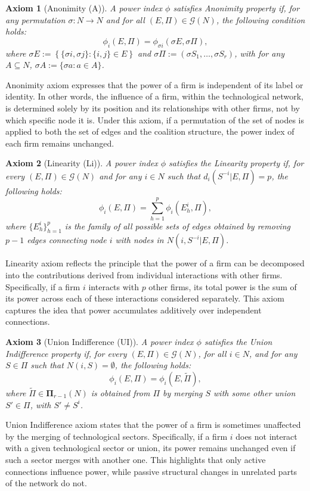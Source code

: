 \documentclass[preprint,11pt,authoryear]{elsarticle}
\theoremstyle{plain}
\newtheorem{axiom}{Axiom}
\begin{document}
\begin{axiom}[Anonimity (A)]\label{Ax-a}
A power index $\phi$ satisfies \emph{Anonimity} property if, for any permutation $\sigma: N \to N$ and for all $(E, \Pi) \in \mathcal{G}(N)$, the following condition holds:
\begin{equation*}
    \phi_i(E, \Pi) = \phi_{\sigma i}(\sigma E, \sigma \Pi),
\end{equation*}
where $\sigma E := \left\{ \{\sigma i, \sigma j\} : \{i, j\} \in E \right\}$ and $\sigma \Pi := (\sigma S_1, \ldots, \sigma S_r)$, with for any $A \subseteq N$, $\sigma A := \{\sigma a : a \in A\}$.
\end{axiom}
Anonimity axiom expresses that the power of a firm is independent of its label or identity. In other words, the influence of a firm, within the technological network, is determined solely by its position and its relationships with other firms, not by which specific node it is. Under this axiom, if a permutation of the set of nodes is applied to both the set of edges and the coalition structure, the power index of each firm remains unchanged. 



\begin{axiom}[Linearity (Li)]\label{Ax-l}
A power index $\phi$ satisfies the \emph{Linearity} property if, for every $(E,\Pi)\in\mathcal{G}(N)$ and for any $i \in N$ such that 
$d_i (S^{-i}|E, \Pi) = p$, the following holds:
\[
\phi_i(E, \Pi) = \sum_{h=1}^p \phi_i(E_h^i, \Pi),
\]
where $\{E_h^i\}_{h=1}^p$ is the family of all possible sets of edges obtained by removing $p - 1$ edges connecting node $i$ with nodes in $N(i, S^{-i}|E, \Pi)$.
\end{axiom}
Linearity axiom reflects the principle that the power of a firm can be decomposed into the contributions derived from individual interactions with other firms. Specifically, if a firm $i$ interacts with $p$ other firms, its total power is the sum of its power across each of these interactions considered separately. This axiom captures the idea that power accumulates additively over independent connections.

\begin{axiom}[Union Indifference (UI)]\label{Ax-UI}
A power index $\phi$ satisfies the \emph{Union Indifference} property if, for every $(E,\Pi) \in \mathcal{G}(N)$, for all $i \in N$, and for any $S \in \Pi$ such that $N(i, S) = \emptyset$, the following holds:
\[
\phi_i(E, \Pi) = \phi_i(E, \tilde{\Pi}),
\]
where $\tilde{\Pi} \in \mathbf{\Pi}_{r-1}(N)$ is obtained from $\Pi$ by merging $S$ with some other union $S' \in \Pi$, with $S' \neq S^i$.
\end{axiom}
Union Indifference axiom states that the power of a firm is sometimes unaffected by the merging of technological sectors. Specifically, if a firm $i$ does not interact with a given technological sector or union, its power remains unchanged even if such a sector merges with another one. This highlights that only active connections influence power, while passive structural changes in unrelated parts of the network do not.
\end{document}

